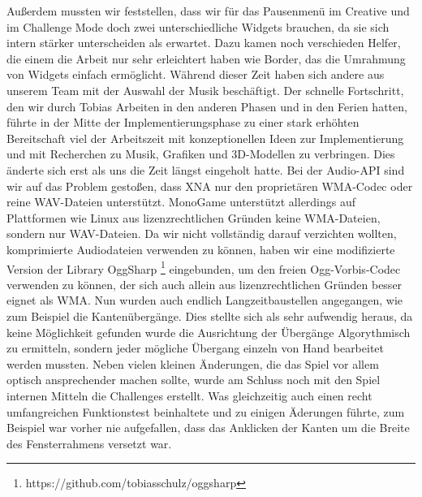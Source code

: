 Außerdem mussten wir feststellen, dass wir für das Pausenmenü im Creative und im Challenge Mode doch zwei unterschiedliche Widgets brauchen, da sie sich intern stärker unterscheiden als erwartet. Dazu kamen noch verschieden Helfer, die einem die Arbeit nur sehr erleichtert haben wie Border, das die Umrahmung von Widgets einfach ermöglicht.
Während dieser Zeit haben sich andere aus unserem Team mit der Auswahl der Musik beschäftigt.
Der schnelle Fortschritt, den wir durch Tobias Arbeiten in den anderen Phasen und in den Ferien hatten, führte in der Mitte der Implementierungsphase zu einer stark erhöhten Bereitschaft viel der Arbeitszeit mit konzeptionellen Ideen zur Implementierung und mit Recherchen zu Musik, Grafiken und 3D-Modellen zu verbringen.
Dies änderte sich erst als uns die Zeit längst eingeholt hatte.
Bei der Audio-API sind wir auf das Problem gestoßen, dass XNA nur den proprietären WMA-Codec oder reine WAV-Dateien unterstützt. MonoGame unterstützt allerdings auf Plattformen wie Linux aus lizenzrechtlichen Gründen keine WMA-Dateien, sondern nur WAV-Dateien. Da wir nicht vollständig darauf verzichten wollten, komprimierte Audiodateien verwenden zu können, haben wir eine modifizierte Version der Library OggSharp \footnote{https://github.com/tobiasschulz/oggsharp} eingebunden, um den freien Ogg-Vorbis-Codec verwenden zu können, der sich auch allein aus lizenzrechtlichen Gründen besser eignet als WMA.
Nun wurden auch endlich Langzeitbaustellen angegangen, wie zum Beispiel die Kantenübergänge.
Dies stellte sich als sehr aufwendig heraus, da keine Möglichkeit gefunden wurde die Ausrichtung der Übergänge Algorythmisch zu ermitteln, sondern jeder mögliche Übergang einzeln von Hand bearbeitet werden mussten.
Neben vielen kleinen Änderungen, die das Spiel vor allem optisch ansprechender machen sollte, wurde am Schluss noch mit den Spiel internen Mitteln die Challenges erstellt. Was gleichzeitig auch einen recht umfangreichen Funktionstest beinhaltete und zu einigen Äderungen führte, zum Beispiel war vorher nie aufgefallen, dass das Anklicken der Kanten um die Breite des Fensterrahmens versetzt war.
